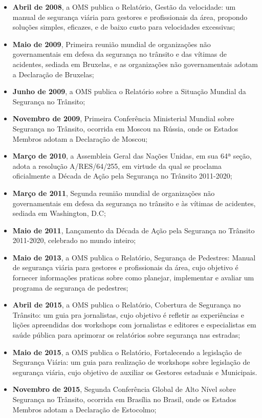 \begin{itemize}
\item \textbf{Abril de 2008}, a OMS publica o Relatório, Gestão da velocidade: um manual de segurança viária para gestores e profissionais da área, propondo soluções simples, eficazes, e de baixo custo para velocidades excessivas;
\item \textbf{Maio de 2009}, Primeira reunião mundial de organizações não governamentais em defesa da segurança no trânsito e das vítimas de acidentes, sediada em Bruxelas, e as organizações não governamentais adotam a Declaração de Bruxelas;
\item \textbf{Junho de 2009}, a OMS publica o Relatório sobre a Situação Mundial da Segurança no Trânsito;
\item \textbf{Novembro de 2009}, Primeira Conferência Ministerial Mundial sobre Segurança no Trânsito, ocorrida em Moscou na Rússia, onde os Estados Membros adotam a Declaração de Moscou;
\item \textbf{Março de 2010}, a Assembleia Geral das Nações Unidas, em sua 64ª seção, adota a resolução A/RES/64/255, em virtude da qual se proclama oﬁcialmente a Década de Ação pela Segurança no Trânsito 2011-2020;
\item \textbf{Março de 2011}, Segunda reunião mundial de organizações não governamentais em defesa da segurança no trânsito e às vítimas de acidentes, sediada em Washington, D.C;
\item \textbf{Maio de 2011}, Lançamento da Década de Ação pela Segurança no Trânsito 2011-2020, celebrado no mundo inteiro;
\item \textbf{Maio de 2013}, a OMS publica o Relatório, Segurança de Pedestres: Manual de segurança viária para gestores e profissionais da área, cujo objetivo é fornecer informações praticas sobre como planejar, implementar e avaliar um programa de segurança de pedestres;
\item \textbf{Abril de 2015}, a OMS publica o Relatório, Cobertura de Segurança no Trânsito: um guia pra jornalistas, cujo objetivo é refletir as experiências e lições apreendidas dos workshops com jornalistas e editores e especialistas em saúde pública para aprimorar os relatórios sobre segurança nas estradas;
\item \textbf{Maio de 2015}, a OMS publica o Relatório, Fortalecendo a legislação de Segurança Viária: um guia para realização de workshops sobre legislação de segurança viária, cujo objetivo de auxiliar os Gestores estaduais e Municipais.
\item \textbf{Novembro de 2015}, Segunda Conferência Global de Alto Nível sobre Segurança no Trânsito, ocorrida em Brasília no Brasil, onde os Estados Membros adotam a Declaração de Estocolmo;

\end{itemize}
